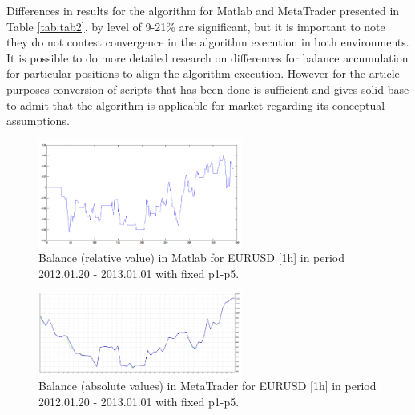 \documentclass[runningheads,a4paper]{llncs}
\begin{document}
Differences in results for the algorithm for Matlab and MetaTrader presented in Table \ref{tab:tab2}. by level of 9-21\% are significant, but it is important to note they do not contest convergence in the algorithm execution in both environments. It is possible to do more detailed research on differences for balance accumulation for particular positions to align the algorithm execution. However for the article purposes conversion of scripts that has been done is sufficient and gives solid base to admit that the algorithm is applicable for market regarding its conceptual assumptions.

\begin{figure}[h!]
\centering
\includegraphics[width = 0.6\textwidth]{figures/rys16.png}
\caption{Balance (relative value) in Matlab for EURUSD [1h] in period 2012.01.20 - 2013.01.01 with fixed p1-p5.}
\label{fig:fig16}
\end{figure}
\FloatBarrier
\begin{figure}[h!]
\centering
\includegraphics[width = 0.6\textwidth]{figures/rys17.png}
\caption{Balance (absolute values) in MetaTrader for EURUSD [1h] in period 2012.01.20 - 2013.01.01 with fixed p1-p5.}
\label{fig:fig17}
\end{figure}
\FloatBarrier
\end{document}
